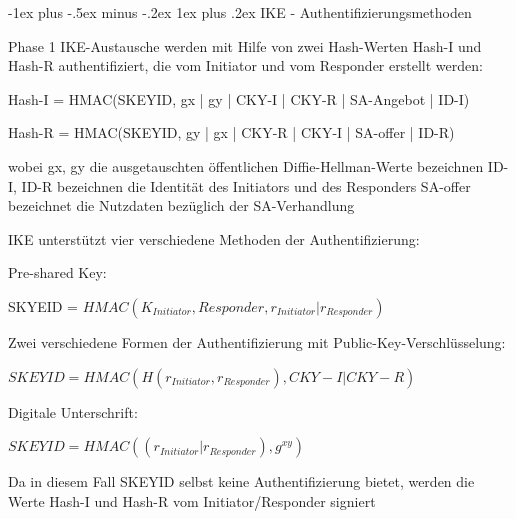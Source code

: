 \documentclass[a4paper]{article}
\makeatletter
\renewcommand{\subsubsection}{\@startsection{subsubsection}{3}{0mm}%
 {-1ex plus -.5ex minus -.2ex}%
 {1ex plus .2ex}%
 {\normalfont\small\bfseries}}
\makeatother
\begin{document}
\begin{multicols}{3}
      \subsubsection{IKE - Authentifizierungsmethoden}
      \begin{itemize*}
            \item Phase 1 IKE-Austausche werden mit Hilfe von zwei Hash-Werten Hash-I und Hash-R authentifiziert, die vom Initiator und vom Responder erstellt werden:
            \begin{itemize*}
                  \item Hash-I = HMAC(SKEYID, gx | gy | CKY-I | CKY-R | SA-Angebot | ID-I)
                  \item Hash-R = HMAC(SKEYID, gy | gx | CKY-R | CKY-I | SA-offer | ID-R)
                  \item wobei gx, gy die ausgetauschten öffentlichen Diffie-Hellman-Werte bezeichnen ID-I, ID-R bezeichnen die Identität des Initiators und des Responders SA-offer bezeichnet die Nutzdaten bezüglich der SA-Verhandlung
            \end{itemize*}
            \item IKE unterstützt vier verschiedene Methoden der Authentifizierung:
            \begin{itemize*}
                  \item Pre-shared Key:
                  \begin{itemize*}
                        \item SKYEID = $HMAC(K_{Initiator}, Responder , r_{Initiator} | r_{Responder})$
                  \end{itemize*}
                  \item Zwei verschiedene Formen der Authentifizierung mit Public-Key-Verschlüsselung:
                  \begin{itemize*}
                        \item $SKEYID = HMAC(H(r_{Initiator}, r_{Responder}), CKY-I | CKY-R)$
                  \end{itemize*}
                  \item Digitale Unterschrift:
                  \begin{itemize*}
                        \item $SKEYID = HMAC((r_{Initiator} | r_{Responder}), g^{xy})$
                        \item Da in diesem Fall SKEYID selbst keine Authentifizierung bietet, werden die Werte Hash-I und Hash-R vom Initiator/Responder signiert
                  \end{itemize*}
            \end{itemize*}
      \end{itemize*}


\end{multicols}
\end{document}
